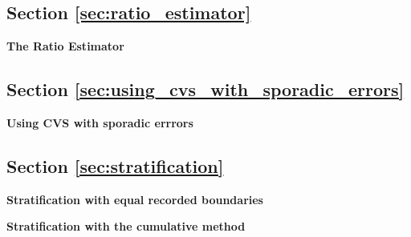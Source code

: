\subsection{Section \ref{sec:ratio_estimator}}

\begin{exercise}
\label{ex:ratio_estimator}

\textbf{The Ratio Estimator}






\end{exercise}

\subsection{Section \ref{sec:using_cvs_with_sporadic_errors}}

\begin{exercise}
\label{ex:sporadic}

\textbf{Using CVS with sporadic errrors}









\end{exercise}

\subsection{Section \ref{sec:stratification}}

\begin{exercise}
\label{ex:stratification_equal}

\textbf{Stratification with equal recorded boundaries}




\end{exercise}

\begin{exercise}
\label{ex:stratification_cumulative}

\textbf{Stratification with the cumulative method}









\end{exercise}

